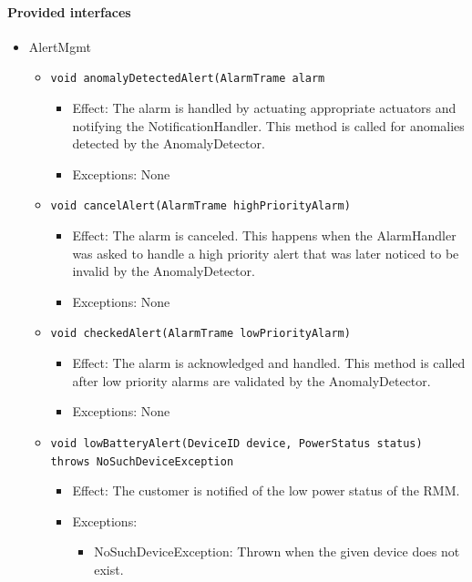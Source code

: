 \documentclass[a4paper,10pt]{article}
\begin{document}
\paragraph{Provided interfaces}
\begin{itemize}
	\item AlertMgmt
    \begin{itemize}
    	\item \texttt{void anomalyDetectedAlert(AlarmTrame alarm}
        \begin{itemize}
            \item Effect: The alarm is handled by actuating appropriate actuators and notifying the NotificationHandler. This method is called for anomalies detected by the AnomalyDetector.
            \item Exceptions: None
		\end{itemize}
    	
    	\item \texttt{void cancelAlert(AlarmTrame highPriorityAlarm)}
        \begin{itemize}
            \item Effect: The alarm is canceled. This happens when the AlarmHandler was asked to handle a high priority alert that was later noticed to be invalid by the AnomalyDetector.
            \item Exceptions: None
        \end{itemize}
        \item \texttt{void checkedAlert(AlarmTrame lowPriorityAlarm)}
        \begin{itemize}
            \item Effect: The alarm is acknowledged and handled. This method is called after low priority alarms are validated by the AnomalyDetector.
            \item Exceptions: None
		\end{itemize}
        
        \item \texttt{void lowBatteryAlert(DeviceID device, PowerStatus status) throws NoSuchDeviceException}
        \begin{itemize}
        	\item Effect: The customer is notified of the low power status of the RMM.
            \item Exceptions:
            \begin{itemize}
                \item NoSuchDeviceException: Thrown when the given device does not exist.
            \end{itemize}
        \end{itemize}
        

\end{itemize}
\end{itemize}
\end{document}
